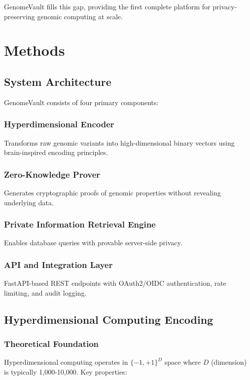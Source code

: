\documentclass[11pt,a4paper]{article}
\begin{document}
GenomeVault fills this gap, providing the first complete platform for privacy-preserving genomic computing at scale.

\section{Methods}

\subsection{System Architecture}

GenomeVault consists of four primary components:

\subsubsection{Hyperdimensional Encoder}
Transforms raw genomic variants into high-dimensional binary vectors using brain-inspired encoding principles.

\subsubsection{Zero-Knowledge Prover}
Generates cryptographic proofs of genomic properties without revealing underlying data.

\subsubsection{Private Information Retrieval Engine}
Enables database queries with provable server-side privacy.

\subsubsection{API and Integration Layer}
FastAPI-based REST endpoints with OAuth2/OIDC authentication, rate limiting, and audit logging.

\subsection{Hyperdimensional Computing Encoding}

\subsubsection{Theoretical Foundation}

Hyperdimensional computing operates in $\{-1,+1\}^D$ space where $D$ (dimension) is typically 1,000-10,000. Key properties:
\end{document}
